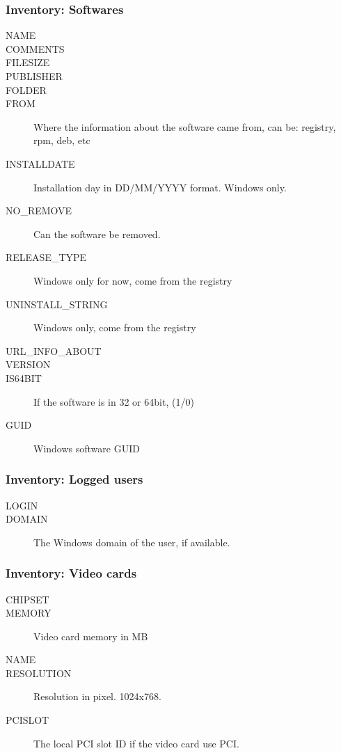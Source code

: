 \documentclass{beamer}
\begin{document}
\begin{frame}
\frametitle{Inventory: Softwares}
\begin{description}
      \item[NAME]
      \item[COMMENTS]
      \item[FILESIZE]
      \item[PUBLISHER]
      \item[FOLDER]
      \item[FROM] Where the information about the software came from, can be: registry, rpm, deb, etc
      \item[INSTALLDATE] Installation day in DD/MM/YYYY format. Windows only.
      \item[NO\_REMOVE] Can the software be removed.
      \item[RELEASE\_TYPE] Windows only for now, come from the registry
      \item[UNINSTALL\_STRING] Windows only, come from the registry
      \item[URL\_INFO\_ABOUT]
      \item[VERSION]
      \item[IS64BIT] If the software is in 32 or 64bit, (1/0)
      \item[GUID] Windows software GUID
\end{description}
\end{frame}
\begin{frame}
\frametitle{Inventory: Logged users}
\begin{description}
      \item[LOGIN]
      \item[DOMAIN] The Windows domain of the user, if available.
\end{description}
\end{frame}
\begin{frame}
\frametitle{Inventory: Video cards}
\begin{description}
      \item[CHIPSET]
      \item[MEMORY] Video card memory in MB
      \item[NAME]
      \item[RESOLUTION] Resolution in pixel. 1024x768.
      \item[PCISLOT] The local PCI slot ID if the video card use PCI.
\end{description}
\end{frame}
\end{document}
